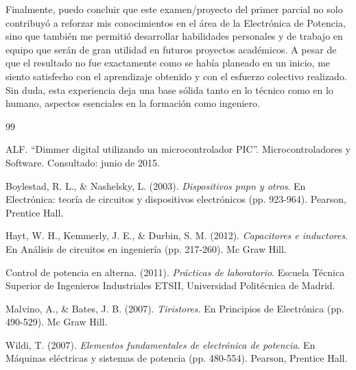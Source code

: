 \documentclass[12pt,a4paper]{article}
\begin{document}
Finalmente, puedo concluir que este examen/proyecto del primer parcial no solo contribuyó a reforzar mis conocimientos en el área de la Electrónica de Potencia, sino que también me permitió desarrollar habilidades personales y de trabajo en equipo que serán de gran utilidad en futuros proyectos académicos. A pesar de que el resultado no fue exactamente como se había planeado en un inicio, me siento satisfecho con el aprendizaje obtenido y con el esfuerzo colectivo realizado. Sin duda, esta experiencia deja una base sólida tanto en lo técnico como en lo humano, aspectos esenciales en la formación como ingeniero.
\begin{thebibliography}{99}

ALF. ``Dimmer digital utilizando un microcontrolador PIC''. Microcontroladores y Software. Consultado: junio de 2015.

Boylestad, R. L., \& Nashelsky, L. (2003). \textit{Dispositivos pnpn y otros}. En Electrónica: teoría de circuitos y dispositivos electrónicos (pp. 923-964). Pearson, Prentice Hall.

Hayt, W. H., Kemmerly, J. E., \& Durbin, S. M. (2012). \textit{Capacitores e inductores}. En Análisis de circuitos en ingeniería (pp. 217-260). Mc Graw Hill.

Control de potencia en alterna. (2011). \textit{Prácticas de laboratorio}. Escuela Técnica Superior de Ingenieros Industriales ETSII, Universidad Politécnica de Madrid.



Malvino, A., \& Bates, J. B. (2007). \textit{Tiristores}. En Principios de Electrónica (pp. 490-529). Mc Graw Hill.

Wildi, T. (2007). \textit{Elementos fundamentales de electrónica de potencia}. En Máquinas eléctricas y sistemas de potencia (pp. 480-554). Pearson, Prentice Hall.

\end{thebibliography}
\end{document}
